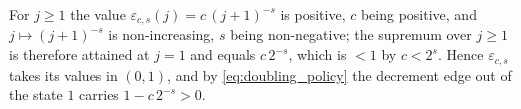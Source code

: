 For $j\geq1$ the value $\varepsilon_{c,s}(j)=c\,(j+1)^{-s}$ is positive, $c$ being positive,
and $j\mapsto(j+1)^{-s}$ is non-increasing, $s$ being non-negative; the supremum over
$j\geq1$ is therefore attained at $j=1$ and equals $c\,2^{-s}$, which is $<1$ by $c<2^s$.
Hence $\varepsilon_{c,s}$ takes its values in $(0,1)$, and by \eqref{eq:doubling_policy} the
decrement edge out of the state $1$ carries $1-c\,2^{-s}>0$.
